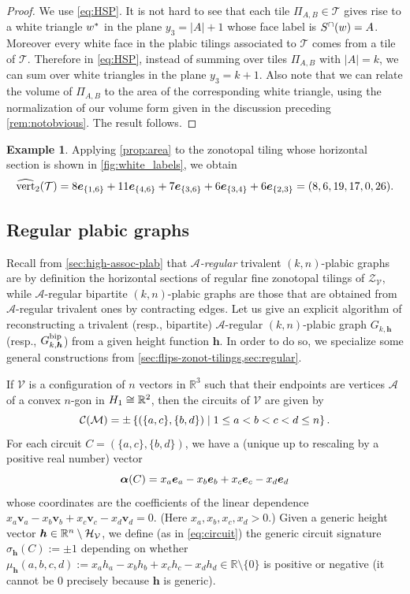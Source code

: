 \documentclass[11pt]{amsart}
\theoremstyle{plain}
\theoremstyle{definition}
\newtheorem{example}[theorem]{Example}
\def\R{\mathbb{R}}
\def\v{{\bm{v}}}
\def\A{\mathcal{A}}
\def\V{\mathcal{V}}
\def\h{{\bm{h}}}
\def\e{{\bm{e}}}
\def\Zon{\mathcal{Z}}
\def\ZV{\Zon_\V}
\newcommand\wh[1]{\hstretch{2}{\hat{\hstretch{0.5}{#1}}}}
\def\vert{\mathrm{vert}}
\def\vertHSP{\wh\vert}
\def\vertHSP{\widehat{\vert}}
\def\VC{\V}
\def\Tcal{\mathcal{T}}
\def\Tiling{\Tcal}
\def\tile{\Pi}
\begin{document}
\begin{proof}
We use \eqref{eq:HSP}.  
It is not hard to see that each tile $\tile_{A,B} \in \Tiling$ 
gives rise to a white triangle 
$w^\ast$  in the plane $y_3 = |A|+1$ whose face label is 
	$S^\cap(w)=A$. Moreover every 
	white face in the plabic tilings associated to $\Tiling$
	comes from a tile of $\Tiling$.
	Therefore in \eqref{eq:HSP}, instead of summing
	over tiles $\tile_{A,B}$ with $|A|=k$, 
	we can sum over white triangles in the plane $y_3 = k+1$.
	Also note that we can relate the volume of $\tile_{A,B}$ to 
	the area of the corresponding white triangle, using  
	the normalization of our volume 
form given in the discussion 
preceding \cref{rem:notobvious}.
The result follows.
\end{proof}

\begin{example}
Applying \cref{prop:area} to the zonotopal tiling whose horizontal section
is shown in 
	\cref{fig:white_labels},
we obtain 
\begin{equation*}
\def\eij#1#2{\e_{\{#1,#2\}}}
	\vertHSP_2(\Tiling)=8 \eij 16+11\eij 46+7\eij 36+6\eij 34+6\eij 23=(8,6,19,17,0,26).
\end{equation*}
\end{example}



\def\Gh{G_{k,\h}}
\def\Ghp{G_{k,\h'}}


\subsection{Regular plabic graphs}
Recall  from \cref{sec:high-assoc-plab} that \emph{$\A$-regular} trivalent $(k,n)$-plabic graphs are by definition the horizontal sections of regular fine zonotopal tilings of $\ZV$, while $\A$-regular bipartite $(k,n)$-plabic graphs are those that are obtained from $\A$-regular trivalent ones by contracting edges. Let us give an explicit algorithm of reconstructing a trivalent (resp., bipartite) $\A$-regular $(k,n)$-plabic graph $\Gh$ (resp., $\bip \Gh$) from a given height function $\h$. In order to do so, we specialize some general constructions from \cref{sec:flips-zonot-tilings,sec:regular}.

\def\muh{\mu_\h}
If $\VC$ is a configuration of $n$ vectors in $\R^3$ such that their endpoints are vertices $\A$ of a convex $n$-gon in $\Hyp_1\cong \R^2$, then the circuits of $\VC$ are given by 
\[\mathcal{C}(\mathcal{M})=\pm\left\{\left(\{a,c\},\{b,d\}\right)\mid 1\leq a<b<c<d\leq n\right\}.\]
For each circuit $C=(\{a,c\},\{b,d\})$, we have a (unique up to rescaling by a positive real number) vector 
\begin{equation}\label{eq:circuit2}
	\alphaC=x_a\e_a-x_b\e_b+x_c\e_c-x_d\e_d
\end{equation}
	whose coordinates are the coefficients of the linear dependence $x_a \v_a-x_b \v_b+x_c\v_c-x_d\v_d=0$. (Here $x_a,x_b,x_c,x_d>0$.) Given a generic height vector $\h\in\GHV$, we define (as in \eqref{eq:circuit}) the generic circuit
	signature $\sigma_\h(C):=\pm1$ depending on whether $\muh(a,b,c,d):=x_a h_a-x_b h_b+x_ch_c-x_dh_d\in\R\setminus \{0\}$ is positive or negative (it cannot be $0$ precisely because $\h$ is generic).
\end{document}
